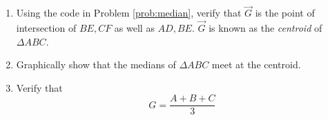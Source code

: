 \documentclass[journal,12pt,twocolumn]{IEEEtran}
\renewcommand\thesection{\arabic{section}}
\begin{document}
\begin{enumerate}[label=\thesection.\arabic*
,ref=\thesection.\theenumi]
\begin{align}
\vec{x} &= \brak{N^T}^{-1}  \vec{p}
\\
&= N^{-T} \vec{p}
\end{align}
%
The following code yields the point of intersection 
\begin{equation}
\vec{G} =
\begin{pmatrix}
1
\\
0
\end{pmatrix}
\end{equation}

\item
Using the code in Problem \ref{prob:median}, verify that $\vec{G}$ is the point of intersection of $BE,CF$ as 
well as
$AD,BE$.  $\vec{G}$ is known as the {\em centroid} of $\Delta ABC$.
\\
\item
Graphically show that the medians of $\Delta ABC$ meet at the centroid.
\\
\item
Verify that
\begin{equation}
G = \frac{A+B+C}{3}
\end{equation}
\end{enumerate}
\end{document}
